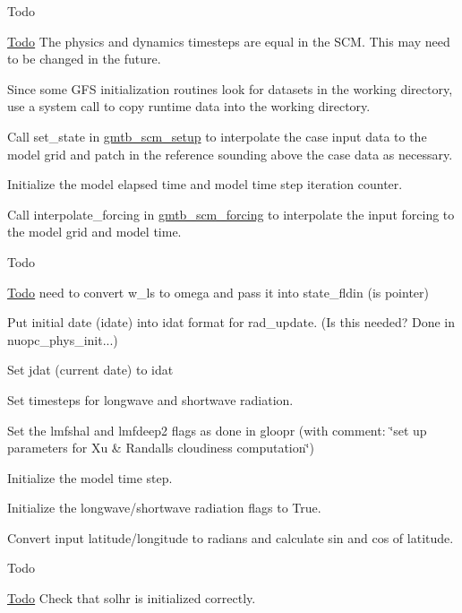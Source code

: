 \begin{DoxyItemize}
\item \begin{DoxyRefDesc}{Todo}
\item[\hyperlink{todo__todo000003}{Todo}]The physics and dynamics timesteps are equal in the S\+CM. This may need to be changed in the future. \end{DoxyRefDesc}

\item Since some G\+FS initialization routines look for datasets in the working directory, use a system call to copy runtime data into the working directory.
\item Call set\+\_\+state in \hyperlink{group__setup}{gmtb\+\_\+scm\+\_\+setup} to interpolate the case input data to the model grid and patch in the reference sounding above the case data as necessary.
\item Initialize the model elapsed time and model time step iteration counter.
\item Call interpolate\+\_\+forcing in \hyperlink{group__forcing}{gmtb\+\_\+scm\+\_\+forcing} to interpolate the input forcing to the model grid and model time.
\item \begin{DoxyRefDesc}{Todo}
\item[\hyperlink{todo__todo000004}{Todo}]need to convert w\+\_\+ls to omega and pass it into state\+\_\+fldin (is pointer) \end{DoxyRefDesc}

\item Put initial date (idate) into idat format for rad\+\_\+update. (Is this needed? Done in nuopc\+\_\+phys\+\_\+init...)
\item Set jdat (current date) to idat
\item Set timesteps for longwave and shortwave radiation.
\item Set the lmfshal and lmfdeep2 flags as done in gloopr (with comment\+: \char`\"{}set up parameters for Xu \& Randall\textquotesingle{}s cloudiness computation\char`\"{})
\item Initialize the model time step.
\item Initialize the longwave/shortwave radiation flags to True.
\item Convert input latitude/longitude to radians and calculate sin and cos of latitude.
\item \begin{DoxyRefDesc}{Todo}
\item[\hyperlink{todo__todo000005}{Todo}]Check that solhr is initialized correctly. \end{DoxyRefDesc}


\end{DoxyItemize}
